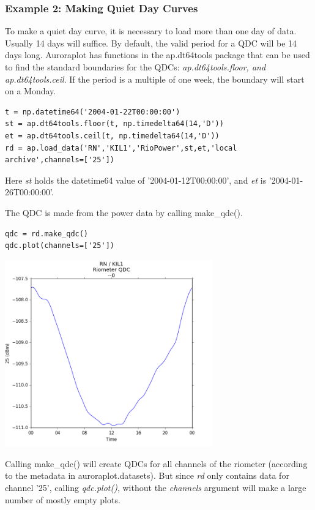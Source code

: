 \documentclass{article}
\begin{document}
\subsubsection{Example 2: Making Quiet Day Curves}

To make a quiet day curve, it is necessary to load more than one day of data. Usually 14 days will suffice. By default, the valid period for a QDC will be 14 days long.
Auroraplot has functions in the ap.dt64tools package that can be used to find the standard boundaries for the QDCs: {\it ap.dt64tools.floor, and ap.dt64tools.ceil}. If the period is a multiple of one week, the boundary will start on a Monday.

\begin{lstlisting}[style=pythonstyle]
t = np.datetime64('2004-01-22T00:00:00')
st = ap.dt64tools.floor(t, np.timedelta64(14,'D'))
et = ap.dt64tools.ceil(t, np.timedelta64(14,'D'))
rd = ap.load_data('RN','KIL1','RioPower',st,et,'local archive',channels=['25'])
\end{lstlisting}

Here {\it st} holds the datetime64 value of '2004-01-12T00:00:00', and {\it et} is '2004-01-26T00:00:00'.

The QDC is made from the power data by calling make\_qdc().

\begin{lstlisting}[style=pythonstyle]
qdc = rd.make_qdc()
qdc.plot(channels=['25'])
\end{lstlisting}

\includegraphics[width=9cm]{images/figure_2.png}


Calling make\_qdc() will create QDCs for all channels of the riometer (according to the metadata in auroraplot.datasets). But since {\it rd} only contains data for channel '25', calling {\it qdc.plot()}, without the {\it channels} argument will make a large number of mostly empty plots.
\end{document}
